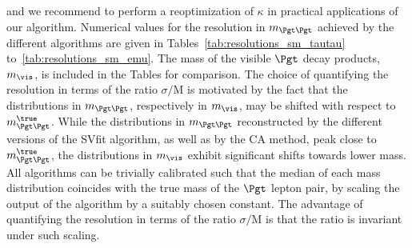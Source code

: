 and we recommend to perform a reoptimization of $\kappa$ in practical applications of our algorithm.
Numerical values for the resolution in $m_{\Pgt\Pgt}$ achieved by the different algorithms are given in Tables~\ref{tab:resolutions_sm_tautau} to~\ref{tab:resolutions_sm_emu}.
The mass of the visible $\Pgt$ decay products, $m_{\vis}$, is included in the Tables for comparison.
The choice of quantifying the resolution in terms of the ratio $\sigma/\textrm{M}$ is motivated 
by the fact that the distributions in $m_{\Pgt\Pgt}$, respectively in $m_{\vis}$, may be shifted with respect to $m_{\Pgt\Pgt}^{\true}$.
While the distributions in $m_{\Pgt\Pgt}$ reconstructed by the different versions of the SVfit algorithm,
as well as by the CA method, peak close to $m_{\Pgt\Pgt}^{\true}$,
the distributions in $m_{\vis}$ exhibit significant shifts towards lower mass.
All algorithms can be trivially calibrated such that the median of each mass distribution coincides with the true mass of the $\Pgt$ lepton pair,
by scaling the output of the algorithm by a suitably chosen constant.
The advantage of quantifying the resolution in terms of the ratio $\sigma/\textrm{M}$ is that the ratio
is invariant under such scaling.

%
%

